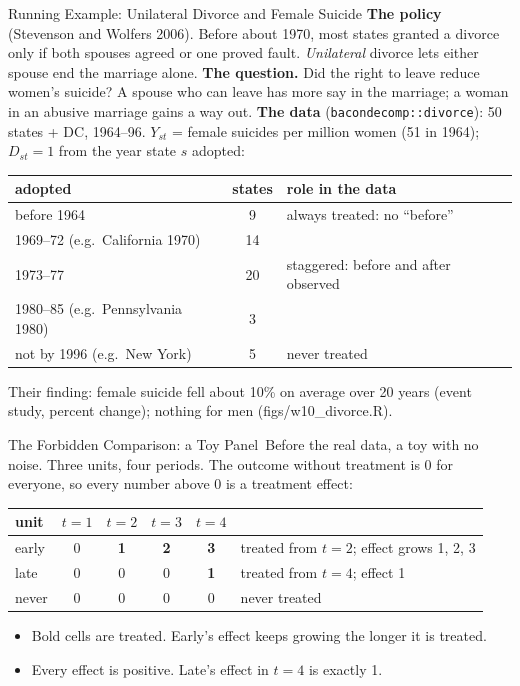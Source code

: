 \documentclass[aspectratio=169,11pt,xcolor=dvipsnames]{beamer}
\newcommand{\srcp}[1]{{\scriptsize\color{gray}(#1)}}
\newcommand{\core}{\,\raisebox{0.6pt}{\textcolor{corestar}{$\bigstar$}}}
\begin{document}
\begin{frame}{Running Example: Unilateral Divorce and Female Suicide}
\small
\textbf{The policy} \srcp{Stevenson and Wolfers 2006}. Before about 1970, most states granted a
divorce only if both spouses agreed or one proved fault. \emph{Unilateral} divorce lets either
spouse end the marriage alone.
\vskip2pt
\textbf{The question.} Did the right to leave reduce women's suicide? A spouse who can leave
has more say in the marriage; a woman in an abusive marriage gains a way out.
\vskip2pt
\textbf{The data} (\texttt{bacondecomp::divorce}): 50 states + DC, 1964--96. $Y_{st}$ = female
suicides per million women (51 in 1964); $D_{st} = 1$ from the year state $s$ adopted:
\vskip1pt
\begin{center}\footnotesize
\renewcommand{\arraystretch}{1.0}
\begin{tabular}{@{}lcl@{}}
\toprule
adopted & states & role in the data \\
\midrule
before 1964 & 9 & always treated: no ``before'' \\
1969--72 (e.g.\ California 1970) & 14 & \\
1973--77 & 20 & staggered: before and after observed \\
1980--85 (e.g.\ Pennsylvania 1980) & 3 & \\
not by 1996 (e.g.\ New York) & 5 & never treated \\
\bottomrule
\end{tabular}
\end{center}
{\footnotesize Their finding: female suicide fell about 10\% on average over 20 years
(event study, percent change); nothing for men \srcp{figs/w10\_divorce.R}.}
\end{frame}

\begin{frame}{The Forbidden Comparison: a Toy Panel\core}
Before the real data, a toy with no noise. Three units, four periods. The outcome without
treatment is \alert{0 for everyone}, so every number above 0 is a treatment effect:
\vskip4pt
\begin{center}
\renewcommand{\arraystretch}{1.25}
\begin{tabular}{@{}lcccc l@{}}
\toprule
unit & $t=1$ & $t=2$ & $t=3$ & $t=4$ & \\
\midrule
early & 0 & \textcolor{dukeblue}{\textbf{1}} & \textcolor{dukeblue}{\textbf{2}} & \textcolor{dukeblue}{\textbf{3}} & treated from $t = 2$; effect grows 1, 2, 3 \\
late  & 0 & 0 & 0 & \textcolor{accent}{\textbf{1}} & treated from $t = 4$; effect 1 \\
never & 0 & 0 & 0 & 0 & never treated \\
\bottomrule
\end{tabular}
\end{center}
\vskip4pt
\begin{itemize}\itemsep3pt
  \item Bold cells are treated. Early's effect keeps growing the longer it is treated.
  \item Every effect is positive. Late's effect in $t = 4$ is exactly 1.
\end{itemize}
\end{frame}
\end{document}
